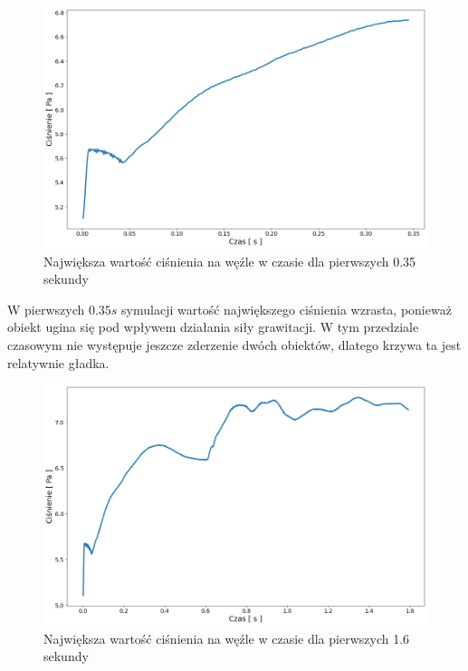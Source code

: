 \documentclass[12pt, letterpaper]{report}
\begin{document}
    \begin{figure}[H]
        \centering
        \includegraphics[width=17cm]{pressure_pressure02_01}
        \caption{
            Największa wartość ciśnienia na węźle w czasie dla pierwszych 0.35 sekundy
        }
    \end{figure}

    W pierwszych $0.35s$ symulacji wartość największego ciśnienia wzrasta, ponieważ obiekt
    ugina się pod wpływem działania siły grawitacji. W tym przedziale czasowym nie występuje 
    jeszcze zderzenie dwóch obiektów, dlatego krzywa ta jest relatywnie gładka.

    \clearpage
    \begin{figure}[H]
        \centering
        \includegraphics[width=17cm]{pressure_pressure02_02}
        \caption{
            Największa wartość ciśnienia na węźle w czasie dla pierwszych 1.6 sekundy
        }
    \end{figure}
\end{document}
